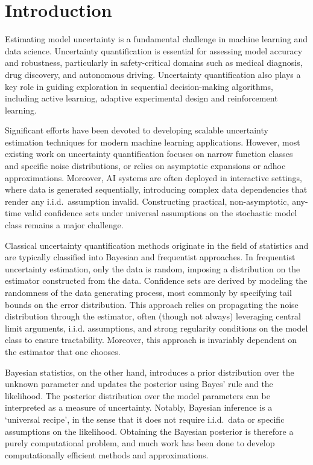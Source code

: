 \section{Introduction}
Estimating model uncertainty is a fundamental challenge in machine learning and data science. Uncertainty quantification is essential for assessing model accuracy and robustness, particularly in safety-critical domains such as medical diagnosis, drug discovery, and autonomous driving. Uncertainty quantification also plays a key role in guiding exploration in sequential decision-making algorithms, including active learning, adaptive experimental design and reinforcement learning. 

Significant efforts have been devoted to developing scalable uncertainty estimation techniques for modern machine learning applications. However, most existing work on uncertainty quantification focuses on narrow function classes and specific noise distributions, or relies on asymptotic expansions or adhoc approximations. Moreover, AI systems are often deployed in interactive settings, where data is generated sequentially, introducing complex data dependencies that render any i.i.d.~assumption invalid. Constructing practical, non-asymptotic, any-time valid confidence sets under universal assumptions on the stochastic model class remains a major challenge.

Classical uncertainty quantification methods originate in the field of statistics and are typically classified into Bayesian and frequentist approaches. In frequentist uncertainty estimation, only the data is random, imposing a distribution on the estimator constructed from the data. Confidence sets are derived by modeling the randomness of the data generating process, most commonly by specifying tail bounds on the error distribution. This approach relies on propagating the noise distribution through the estimator, often (though not always) leveraging central limit arguments, i.i.d. assumptions, and strong regularity conditions on the model class to ensure tractability. Moreover, this approach is invariably dependent on the estimator that one chooses. 

Bayesian statistics, on the other hand, introduces a prior distribution over the unknown parameter and updates the posterior using Bayes' rule and the likelihood. The posterior distribution over the model parameters can be interpreted as a measure of uncertainty. Notably, Bayesian inference is a `universal recipe', in the sense that it does not require i.i.d.~data or specific assumptions on the likelihood. Obtaining the Bayesian posterior is therefore a purely computational problem, and much work has been done to develop computationally efficient methods and approximations. 

